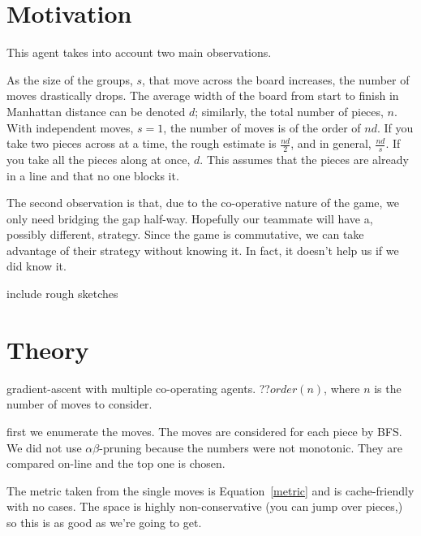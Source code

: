 \documentclass[twocolumn]{article}
\begin{document}
\section{Motivation}


This agent takes into account two main observations.

As the size of the groups, $s$, that move across the board increases, the number of moves drastically drops. The average width of the board from start to finish in Manhattan distance can be denoted $d$; similarly, the total number of pieces, $n$. With independent moves, $s = 1$, the number of moves is of the order of $nd$. If you take two pieces across at a time, the rough estimate is $\frac{nd}{2}$, and in general, $\frac{nd}{s}$. If you take all the pieces along at once, $d$. This assumes that the pieces are already in a line and that no one blocks it.

The second observation is that, due to the co-operative nature of the game, we only need bridging the gap half-way. Hopefully our teammate will have a, possibly different, strategy. Since the game is commutative, we can take advantage of their strategy without knowing it. In fact, it doesn't help us if we did know it.

include rough sketches

\section{Theory}


gradient-ascent with multiple co-operating agents.\cite{} ??$order(n)$, where $n$ is the number of moves to consider.

first we enumerate the moves. The moves are considered for each piece by BFS. We did not use $\alpha\beta$-pruning because the numbers were not monotonic.\cite{} They are compared on-line and the top one is chosen.

The metric taken from the single moves is Equation~\ref{metric} and is cache-friendly with no cases. The space is highly non-conservative (you can jump over pieces,) so this is as good as we're going to get.
\end{document}
